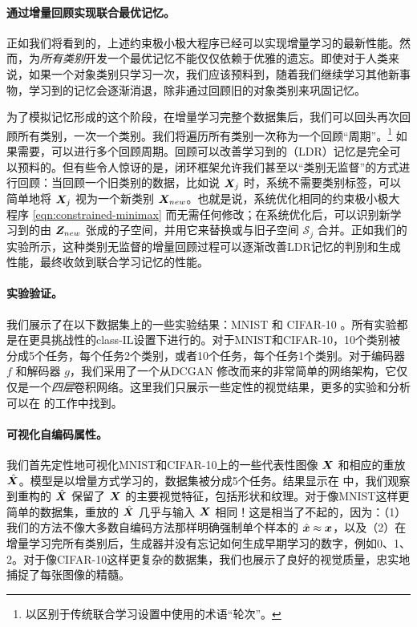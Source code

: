 \documentclass[../../book-main.tex]{subfiles}
\begin{document}
\paragraph{通过增量回顾实现联合最优记忆。} 
正如我们将看到的，上述约束极小极大程序已经可以实现增量学习的最新性能。然而，为{\em 所有类别}开发一个最优记忆不能仅仅依赖于优雅的遗忘。即使对于人类来说，如果一个对象类别只学习一次，我们应该预料到，随着我们继续学习其他新事物，学习到的记忆会逐渐消退，除非通过回顾旧的对象类别来巩固记忆。

为了模拟记忆形成的这个阶段，在增量学习完整个数据集后，我们可以回头再次回顾所有类别，一次一个类别。我们将遍历所有类别一次称为一个回顾“周期”。\footnote{以区别于传统联合学习设置中使用的术语“轮次”。} 如果需要，可以进行多个回顾周期。回顾可以改善学习到的（LDR）记忆是完全可以预料的。但有些令人惊讶的是，闭环框架允许我们甚至以“{类别无监督}”的方式进行回顾：当回顾一个旧类别的数据，比如说 $\bm{X}_j$ 时，系统不需要类别标签，可以简单地将 $\bm{X}_j$ 视为一个新类别 $\bm{X}_{new}$。也就是说，系统优化相同的约束极小极大程序 \eqref{eqn:constrained-minimax} 而无需任何修改；在系统优化后，可以识别新学习到的由 $\bm{Z}_{new}$ 张成的子空间，并用它来替换或与旧子空间 $\mathcal{S}_j$ 合并。正如我们的实验所示，这种类别无监督的增量回顾过程可以逐渐改善LDR记忆的判别和生成性能，最终收敛到联合学习记忆的性能。

\paragraph{实验验证。}
我们展示了在以下数据集上的一些实验结果：MNIST \cite{lecun1998gradient} 和 CIFAR-10 \cite{krizhevsky2014cifar}。所有实验都是在更具挑战性的class-IL设置下进行的。对于MNIST和CIFAR-10，10个类别被分成5个任务，每个任务2个类别，或者10个任务，每个任务1个类别。对于编码器 $f$ 和解码器 $g$，我们采用了一个从DCGAN \cite{radford2016unsupervised} 修改而来的非常简单的网络架构，它仅仅是一个{\em 四层}卷积网络。这里我们只展示一些定性的视觉结果，更多的实验和分析可以在 \cite{tong2023incremental} 的工作中找到。

\paragraph{可视化自编码属性。}
我们首先定性地可视化MNIST和CIFAR-10上的一些代表性图像 $\bm{X}$ 和相应的重放 $\hat{\bm{X}}$。模型是以增量方式学习的，数据集被分成5个任务。结果显示在  中，我们观察到重构的 $\hat{\bm{X}}$ 保留了 $\bm{X}$ 的主要视觉特征，包括形状和纹理。对于像MNIST这样更简单的数据集，重放的 $\hat{\bm{X}}$ 几乎与输入 $\bm{X}$ 相同！这是相当了不起的，因为：（1）我们的方法不像大多数自编码方法那样明确强制单个样本的 $\hat{\bm{x}} \approx \bm{x}$，以及（2）在增量学习完所有类别后，生成器并没有忘记如何生成早期学习的数字，例如0、1、2。对于像CIFAR-10这样更复杂的数据集，我们也展示了良好的视觉质量，忠实地捕捉了每张图像的精髓。
\end{document}
